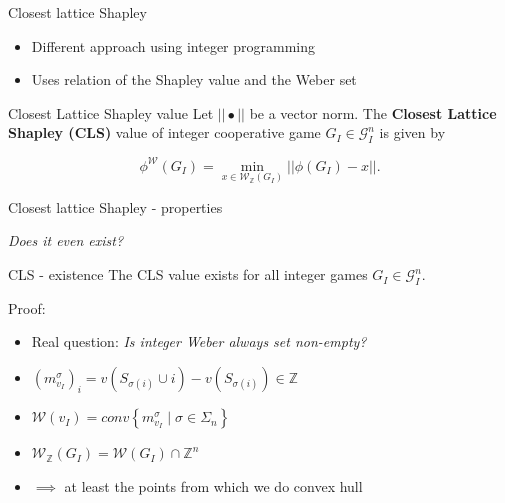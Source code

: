 \documentclass{beamer}
\newcommand{\Z}{\mathbb{Z}}
\begin{document}


\begin{frame}{Closest lattice Shapley}
    \pause
    \begin{itemize}
        \item Different approach using integer programming
        \pause
        \item Uses relation of the Shapley value and the Weber set
    \end{itemize}

    \pause

    \begin{block}{Closest Lattice Shapley value}
        \pause
        Let $||\bullet||$ be a vector norm. 
        The \textbf{Closest Lattice Shapley (CLS)} value of integer cooperative game $G_I \in \mathcal{G}_I^n$ is given by

        \begin{displaymath}
            \phi^\mathcal{W}(G_I)  = \min_{x \in \mathcal{W}_\Z(G_I)} ||\phi(G_I) - x||.
        \end{displaymath}
    \end{block}
\end{frame}



\begin{frame}{Closest lattice Shapley - properties}
    \pause

    \textit{Does it even exist?}

    \pause

    \begin{block}{CLS - existence}
        \pause
        The CLS value exists for all integer games $G_I \in \mathcal{G}_I^n$.
    \end{block}

    \pause

    Proof:

    \begin{itemize}
        \pause
        \item Real question: \textit{Is integer Weber always set non-empty?}
        \pause
        \item $\left(m^\sigma_{v_I}\right)_i=v\left(S_{\sigma(i)}\cup i\right)-v\left(S_{\sigma(i)}\right) \in \Z$
        \pause
        \item $\mathcal{W}(v_I)=conv\left\{m^{\sigma}_{v_I}\mid \sigma \in \Sigma_n\right\}$
        \pause
        \item $\mathcal{W}_{\Z}(G_I) = \mathcal{W}(G_I) \cap \Z^{n}$
        \pause
        \item $\implies$ at least the points from which we do convex hull
    \end{itemize}
\end{frame}
\end{document}
